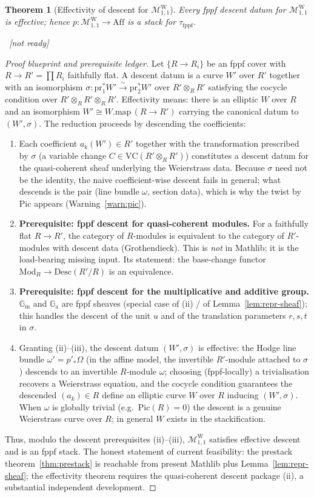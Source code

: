 \documentclass[11pt]{article}
\newcommand{\lean}[1]{\par\smallskip\noindent{\footnotesize\texttt{Lean:\ #1}}\par}
\newcommand{\uses}[1]{}
\newcommand{\notready}{{\footnotesize\textcolor{red!60!black}{\ [not ready]}}}
\theoremstyle{definition}
\theoremstyle{plain}
\newtheorem{theorem}[definition]{Theorem}
\theoremstyle{remark}
\newcommand{\Aff}{\mathrm{Aff}}
\newcommand{\MW}{\mathcal{M}^{\mathrm{W}}_{1,1}}
\newcommand{\VC}{\mathrm{VC}}
\newcommand{\Gm}{\mathbb{G}_{\mathrm m}}
\newcommand{\Ga}{\mathbb{G}_{\mathrm a}}
\newcommand{\map}{\mathrm{map}}
\begin{document}
\begin{theorem}[Effectivity of descent for $\MW$]\label{thm:effective}
Every fppf descent datum for $\MW$ is effective; hence
$p:\MW\to\Aff$ is a stack for $\tau_{\mathrm{fppf}}$.
\lean{}\notready
\uses{def:stack,thm:prestack}
\end{theorem}
\begin{proof}[Proof blueprint and prerequisite ledger]
Let $\{R\to R_i\}$ be an fppf cover with $R\to R'=\prod R_i$ faithfully flat.  A
descent datum is a curve $W'$ over $R'$ together with an isomorphism
$\sigma:\mathrm{pr}_1^*W'\xrightarrow{\sim}\mathrm{pr}_2^*W'$ over
$R'\otimes_R R'$ satisfying the cocycle condition over
$R'\otimes_R R'\otimes_R R'$.  Effectivity means: there is an elliptic
$W$ over $R$ and an isomorphism $W'\cong W.\map\,(R\to R')$ carrying the canonical
datum to $(W',\sigma)$.  The reduction proceeds by descending the coefficients:
\begin{enumerate}[label=(\roman*)]
\item Each coefficient $a_k(W')\in R'$ together with the transformation
prescribed by $\sigma$ (a variable change $C\in\VC(R'\otimes_R R')$) constitutes
a descent datum for the quasi-coherent sheaf underlying the Weierstrass data.
Because $\sigma$ need not be the identity, the naive coefficient-wise descent
fails in general; what descends is the pair (line bundle $\omega$, section data),
which is why the twist by $\mathrm{Pic}$ appears (Warning~\ref{warn:pic}).
\item \textbf{Prerequisite: fppf descent for quasi-coherent modules.}  For a
faithfully flat $R\to R'$, the category of $R$-modules is equivalent to the
category of $R'$-modules with descent data (Grothendieck).  This is
\emph{not} in Mathlib; it is the load-bearing missing input.  Its statement:
the base-change functor $\mathrm{Mod}_R\to\mathrm{Desc}(R'/R)$ is an equivalence.
\item \textbf{Prerequisite: fppf descent for the multiplicative and additive
group.}  $\Gm$ and $\Ga$ are fppf sheaves (special case of (ii) / of
Lemma~\ref{lem:repr-sheaf}); this handles the descent of the unit $u$ and of the
translation parameters $r,s,t$ in $\sigma$.
\item Granting (ii)--(iii), the descent datum $(W',\sigma)$ is effective: the
Hodge line bundle $\omega'=p'_*\Omega$ (in the affine model, the invertible
$R'$-module attached to $\sigma$) descends to an invertible $R$-module $\omega$;
choosing (fppf-locally) a trivialisation recovers a Weierstrass equation, and the
cocycle condition guarantees the descended $(a_k)\in R$ define an elliptic curve
$W$ over $R$ inducing $(W',\sigma)$.  When $\omega$ is globally trivial (e.g.\
$\mathrm{Pic}(R)=0$) the descent is a genuine Weierstrass curve over $R$; in
general $W$ exists in the stackification.
\end{enumerate}
Thus, modulo the descent prerequisites (ii)--(iii), $\MW$ satisfies effective
descent and is an fppf stack.  The honest statement of current feasibility: the
prestack theorem~\ref{thm:prestack} is reachable from present Mathlib plus
Lemma~\ref{lem:repr-sheaf}; the effectivity theorem requires the quasi-coherent
descent package (ii), a substantial independent development.
\end{proof}
\end{document}
